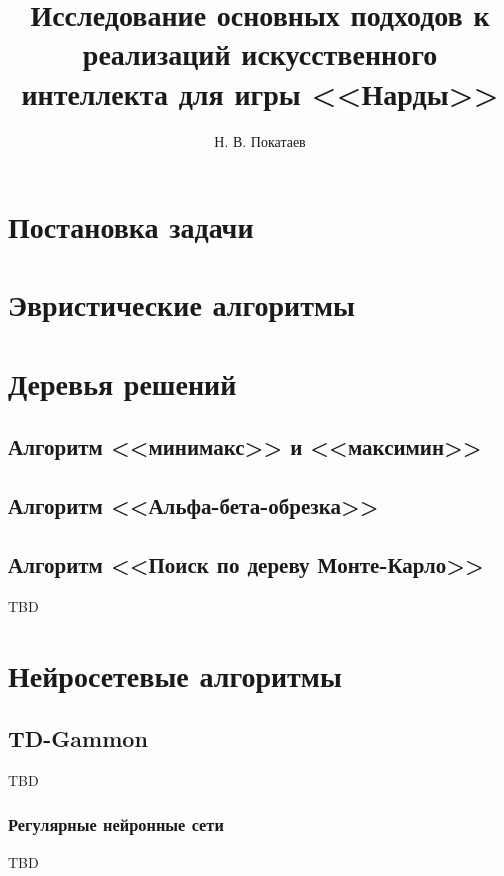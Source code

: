 \documentclass{ammstudconf}
\title{Исследование основных подходов к реализаций искусственного интеллекта для игры <<Нарды>>}
\author{Н. В. Покатаев}
\begin{document}
\maketitle



\section{Постановка задачи}


\section{Эвристические алгоритмы}


\section{Деревья решений}


\subsection{Алгоритм <<минимакс>> и <<максимин>>}


\subsection{Алгоритм <<Альфа-бета-обрезка>>}


\subsection{Алгоритм <<Поиск по дереву Монте-Карло>>}
TBD

\section{Нейросетевые алгоритмы}


\subsection{TD-Gammon}
TBD

\subsubsection{Регулярные нейронные сети}
TBD
\end{document}
